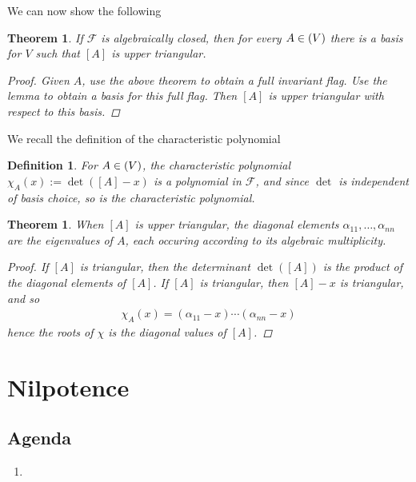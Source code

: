 \documentclass[10pt,twoside,openany,final]{memoir}
\theoremstyle{break}
\newtheorem{theorem}[section]{Theorem}
\newtheorem{definition}[section]{Definition}
\theoremstyle{Break}
\let\End\relax
\DeclareMathOperator{\End}{End}
\newcommand{\F}{\mathcal{F}}
\begin{document}
We can now show the following
\begin{theorem}
	If $\F$ is algebraically closed, then for every $A \in \End(V)$ there is a basis for $V$ such that $[A]$ is upper triangular.
	\begin{proof}
		Given $A$, use the above theorem to obtain a full invariant flag. Use the lemma to obtain a basis for this full flag. Then $[A]$ is upper triangular with respect to this basis.
	\end{proof}
\end{theorem}
We recall the definition of the characteristic polynomial
\begin{definition}
For $A \in \End(V)$, the characteristic polynomial $\chi_A(x):=\det([A]-x)$ is a polynomial in $\F$, and since $\det$ is independent of basis choice, so is the characteristic polynomial.
\end{definition}
\begin{theorem}
	When $[A]$ is upper triangular, the diagonal elements $\alpha_{11},\dots,\alpha_{nn}$ are the eigenvalues of $A$, each occuring according to its algebraic multiplicity.
	\begin{proof}
		If $[A]$ is triangular, then the determinant $\det([A])$ is the product of the diagonal elements of $[A]$. If $[A]$ is triangular, then $[A]-x$ is triangular, and so
		\begin{align*}
			\chi_A(x)=(\alpha_{11}-x)\cdots(\alpha_{nn}-x)
		\end{align*}
		hence the roots of $\chi$ is the diagonal values of $[A]$.
	\end{proof}
\end{theorem}


\chapter{Nilpotence}
\section*{Agenda}
\begin{enumerate}
	\item 
\end{enumerate}
\end{document}
